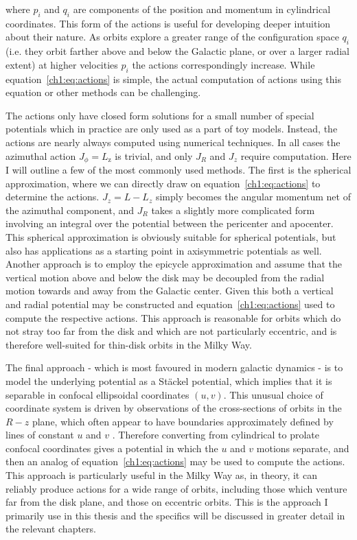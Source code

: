 \noindent where $p_{i}$ and $q_{i}$ are components of the position and momentum in cylindrical coordinates. This form of the actions is useful for developing deeper intuition about their nature. As orbits explore a greater range of the configuration space $q_{i}$ (i.e. they orbit farther above and below the Galactic plane, or over a larger radial extent) at higher velocities $p_{i}$ the actions correspondingly increase. While equation~\eqref{ch1:eq:actions} is simple, the actual computation of actions using this equation or other methods can be challenging.

The actions only have closed form solutions for a small number of special potentials \parencite[again the potential of ][ for example]{henon59a} which in practice are only used as a part of toy models. Instead, the actions are nearly always computed using numerical techniques. In all cases the azimuthal action $J_{\phi} = L_\mathrm{z}$ is trivial, and only $J_{R}$ and $J_{z}$ require computation. Here I will outline a few of the most commonly used methods. The first is the spherical approximation, where we can directly draw on equation~\ref{ch1:eq:actions} to determine the actions. $J_{z} = L - L_{z}$ simply becomes the angular momentum net of the azimuthal component, and $J_{R}$ takes a slightly more complicated form involving an integral over the potential between the pericenter and apocenter. This spherical approximation is obviously suitable for spherical potentials, but also has applications as a starting point in axisymmetric potentials as well. Another approach is to employ the epicycle approximation and assume that the vertical motion above and below the disk may be decoupled from the radial motion towards and away from the Galactic center. Given this both a vertical and radial potential may be constructed and equation~\ref{ch1:eq:actions} used to compute the respective actions. This approach is reasonable for orbits which do not stray too far from the disk and which are not particularly eccentric, and is therefore well-suited for thin-disk orbits in the Milky Way.

The final approach - which is most favoured in modern galactic dynamics - is to model the underlying potential as a St\"{a}ckel potential, which implies that it is separable in confocal ellipsoidal coordinates $(u,v)$. This unusual choice of coordinate system is driven by observations of the cross-sections of orbits in the $R-z$ plane, which often appear to have boundaries approximately defined by lines of constant $u$ and $v$ \parencite[see figure 3.27 in ][]{binney08}. Therefore converting from cylindrical to prolate confocal coordinates gives a potential in which the $u$ and $v$ motions separate, and then an analog of equation~\eqref{ch1:eq:actions} may be used to compute the actions. This approach is particularly useful in the Milky Way as, in theory, it can reliably produce actions for a wide range of orbits, including those which venture far from the disk plane, and those on eccentric orbits. This is the approach I primarily use in this thesis and the specifics will be discussed in greater detail in the relevant chapters.

